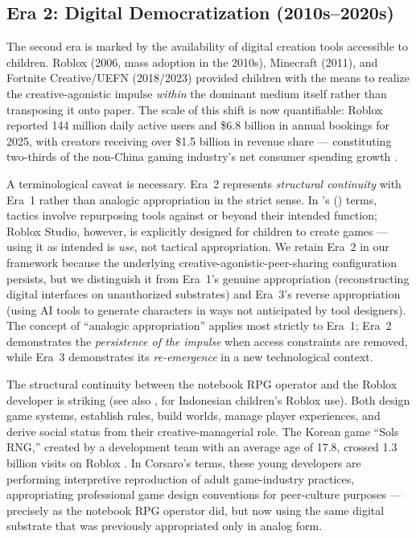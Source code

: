 \documentclass[12pt]{article}
\begin{document}
\subsection{Era 2: Digital Democratization (2010s--2020s)}

The second era is marked by the availability of digital creation tools accessible to children. Roblox (2006, mass adoption in the 2010s), Minecraft (2011), and Fortnite Creative/UEFN (2018/2023) provided children with the means to realize the creative-agonistic impulse \emph{within} the dominant medium itself rather than transposing it onto paper. The scale of this shift is now quantifiable: Roblox reported 144 million daily active users and \$6.8 billion in annual bookings for 2025, with creators receiving over \$1.5 billion in revenue share --- constituting two-thirds of the non-China gaming industry's net consumer spending growth \citep{naavik2026}.

A terminological caveat is necessary. Era~2 represents \emph{structural continuity} with Era~1 rather than analogic appropriation in the strict sense. In \citeauthor{decerteau1984}'s (\citeyear{decerteau1984}) terms, tactics involve repurposing tools against or beyond their intended function; Roblox Studio, however, is explicitly designed for children to create games --- using it as intended is \emph{use}, not tactical appropriation. We retain Era~2 in our framework because the underlying creative-agonistic-peer-sharing configuration persists, but we distinguish it from Era~1's genuine appropriation (reconstructing digital interfaces on unauthorized substrates) and Era~3's reverse appropriation (using AI tools to generate characters in ways not anticipated by tool designers). The concept of ``analogic appropriation'' applies most strictly to Era~1; Era~2 demonstrates the \emph{persistence of the impulse} when access constraints are removed, while Era~3 demonstrates its \emph{re-emergence} in a new technological context.

The structural continuity between the notebook RPG operator and the Roblox developer is striking (see also \citealp{cds2025}, for Indonesian children's Roblox use). Both design game systems, establish rules, build worlds, manage player experiences, and derive social status from their creative-managerial role. The Korean game ``Sols RNG,'' created by a development team with an average age of 17.8, crossed 1.3 billion visits on Roblox \citep{versework2025}. In Corsaro's terms, these young developers are performing interpretive reproduction of adult game-industry practices, appropriating professional game design conventions for peer-culture purposes --- precisely as the notebook RPG operator did, but now using the same digital substrate that was previously appropriated only in analog form.
\end{document}

